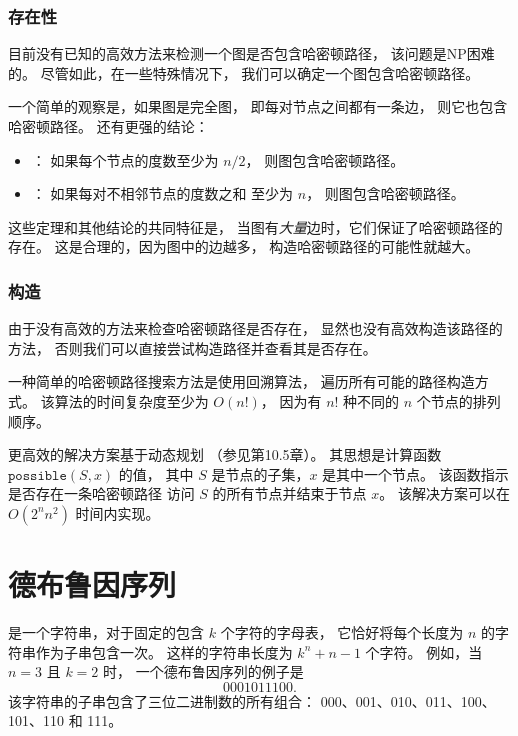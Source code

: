 \subsubsection{存在性}

目前没有已知的高效方法来检测一个图是否包含哈密顿路径，
该问题是NP困难的。
尽管如此，在一些特殊情况下，
我们可以确定一个图包含哈密顿路径。

一个简单的观察是，如果图是完全图，
即每对节点之间都有一条边，
则它也包含哈密顿路径。
还有更强的结论：

\begin{itemize}
\item
{}
： %
如果每个节点的度数至少为 $n/2$，
则图包含哈密顿路径。
\item
{}
： %
如果每对不相邻节点的度数之和
至少为 $n$，
则图包含哈密顿路径。
\end{itemize}

这些定理和其他结论的共同特征是，
当图有\emph{大量}边时，它们保证了哈密顿路径的存在。
这是合理的，因为图中的边越多，
构造哈密顿路径的可能性就越大。

\subsubsection{构造}

由于没有高效的方法来检查哈密顿路径是否存在，
显然也没有高效构造该路径的方法，
否则我们可以直接尝试构造路径并查看其是否存在。

一种简单的哈密顿路径搜索方法是使用回溯算法，
遍历所有可能的路径构造方式。
该算法的时间复杂度至少为 $O(n!)$，
因为有 $n!$ 种不同的 $n$ 个节点的排列顺序。

更高效的解决方案基于动态规划
（参见第10.5章）。
其思想是计算函数
$\texttt{possible}(S,x)$ 的值，
其中 $S$ 是节点的子集，$x$ 是其中一个节点。
该函数指示是否存在一条哈密顿路径
访问 $S$ 的所有节点并结束于节点 $x$。
该解决方案可以在 $O(2^n n^2)$ 时间内实现。

\section{德布鲁因序列}


是一个字符串，对于固定的包含 $k$ 个字符的字母表，
它恰好将每个长度为 $n$ 的字符串作为子串包含一次。
这样的字符串长度为
$k^n+n-1$ 个字符。
例如，当 $n=3$ 且 $k=2$ 时，
一个德布鲁因序列的例子是
\[0001011100.\]
该字符串的子串包含了三位二进制数的所有组合：
000、001、010、011、100、101、110 和 111。

